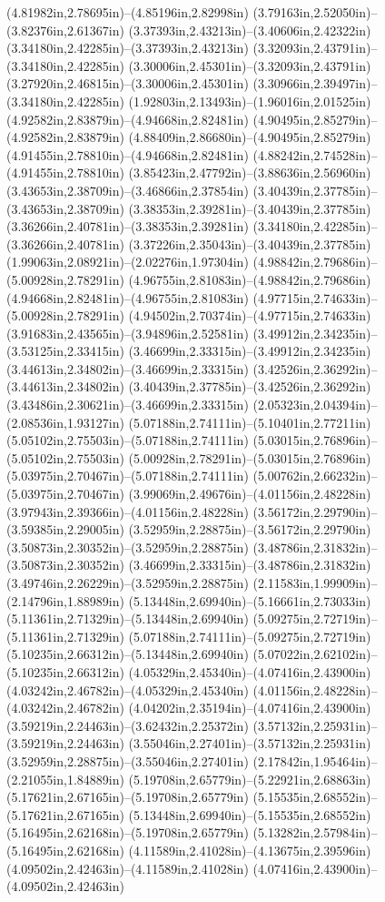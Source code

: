 (4.81982in,2.78695in)--(4.85196in,2.82998in) (3.79163in,2.52050in)--(3.82376in,2.61367in) (3.37393in,2.43213in)--(3.40606in,2.42322in) (3.34180in,2.42285in)--(3.37393in,2.43213in) (3.32093in,2.43791in)--(3.34180in,2.42285in) (3.30006in,2.45301in)--(3.32093in,2.43791in) (3.27920in,2.46815in)--(3.30006in,2.45301in) (3.30966in,2.39497in)--(3.34180in,2.42285in) (1.92803in,2.13493in)--(1.96016in,2.01525in) (4.92582in,2.83879in)--(4.94668in,2.82481in) (4.90495in,2.85279in)--(4.92582in,2.83879in) (4.88409in,2.86680in)--(4.90495in,2.85279in) (4.91455in,2.78810in)--(4.94668in,2.82481in) (4.88242in,2.74528in)--(4.91455in,2.78810in) (3.85423in,2.47792in)--(3.88636in,2.56960in) (3.43653in,2.38709in)--(3.46866in,2.37854in) (3.40439in,2.37785in)--(3.43653in,2.38709in) (3.38353in,2.39281in)--(3.40439in,2.37785in) (3.36266in,2.40781in)--(3.38353in,2.39281in) (3.34180in,2.42285in)--(3.36266in,2.40781in) (3.37226in,2.35043in)--(3.40439in,2.37785in) (1.99063in,2.08921in)--(2.02276in,1.97304in) (4.98842in,2.79686in)--(5.00928in,2.78291in) (4.96755in,2.81083in)--(4.98842in,2.79686in) (4.94668in,2.82481in)--(4.96755in,2.81083in) (4.97715in,2.74633in)--(5.00928in,2.78291in) (4.94502in,2.70374in)--(4.97715in,2.74633in) (3.91683in,2.43565in)--(3.94896in,2.52581in) (3.49912in,2.34235in)--(3.53125in,2.33415in) (3.46699in,2.33315in)--(3.49912in,2.34235in) (3.44613in,2.34802in)--(3.46699in,2.33315in) (3.42526in,2.36292in)--(3.44613in,2.34802in) (3.40439in,2.37785in)--(3.42526in,2.36292in) (3.43486in,2.30621in)--(3.46699in,2.33315in) (2.05323in,2.04394in)--(2.08536in,1.93127in) (5.07188in,2.74111in)--(5.10401in,2.77211in) (5.05102in,2.75503in)--(5.07188in,2.74111in) (5.03015in,2.76896in)--(5.05102in,2.75503in) (5.00928in,2.78291in)--(5.03015in,2.76896in) (5.03975in,2.70467in)--(5.07188in,2.74111in) (5.00762in,2.66232in)--(5.03975in,2.70467in) (3.99069in,2.49676in)--(4.01156in,2.48228in) (3.97943in,2.39366in)--(4.01156in,2.48228in) (3.56172in,2.29790in)--(3.59385in,2.29005in) (3.52959in,2.28875in)--(3.56172in,2.29790in) (3.50873in,2.30352in)--(3.52959in,2.28875in) (3.48786in,2.31832in)--(3.50873in,2.30352in) (3.46699in,2.33315in)--(3.48786in,2.31832in) (3.49746in,2.26229in)--(3.52959in,2.28875in) (2.11583in,1.99909in)--(2.14796in,1.88989in) (5.13448in,2.69940in)--(5.16661in,2.73033in) (5.11361in,2.71329in)--(5.13448in,2.69940in) (5.09275in,2.72719in)--(5.11361in,2.71329in) (5.07188in,2.74111in)--(5.09275in,2.72719in) (5.10235in,2.66312in)--(5.13448in,2.69940in) (5.07022in,2.62102in)--(5.10235in,2.66312in) (4.05329in,2.45340in)--(4.07416in,2.43900in) (4.03242in,2.46782in)--(4.05329in,2.45340in) (4.01156in,2.48228in)--(4.03242in,2.46782in) (4.04202in,2.35194in)--(4.07416in,2.43900in) (3.59219in,2.24463in)--(3.62432in,2.25372in) (3.57132in,2.25931in)--(3.59219in,2.24463in) (3.55046in,2.27401in)--(3.57132in,2.25931in) (3.52959in,2.28875in)--(3.55046in,2.27401in) (2.17842in,1.95464in)--(2.21055in,1.84889in) (5.19708in,2.65779in)--(5.22921in,2.68863in) (5.17621in,2.67165in)--(5.19708in,2.65779in) (5.15535in,2.68552in)--(5.17621in,2.67165in) (5.13448in,2.69940in)--(5.15535in,2.68552in) (5.16495in,2.62168in)--(5.19708in,2.65779in) (5.13282in,2.57984in)--(5.16495in,2.62168in) (4.11589in,2.41028in)--(4.13675in,2.39596in) (4.09502in,2.42463in)--(4.11589in,2.41028in) (4.07416in,2.43900in)--(4.09502in,2.42463in) 